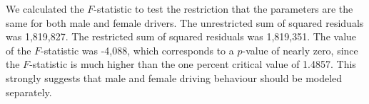 We calculated the $F$-statistic to test the restriction 
that the parameters are the same for both male and female drivers. 
The unrestricted sum of squared residuals was 1,819,827. 
The restricted sum of squared residuals was 1,819,351. 
The value of the $F$-statistic was -4,088, 
which corresponds to a $p$-value of nearly zero, since the $F$-statistic is much higher than 
 the one percent critical value of 1.4857. 
This strongly suggests that male and female driving behaviour should be modeled separately. 
